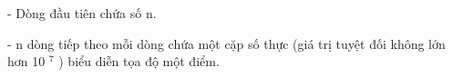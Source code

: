 - Dòng đầu tiên chứa số n.  

   - n dòng tiếp theo mỗi dòng chứa một cặp số thực (giá trị tuyệt đối không lớn hơn 10   $^    7   $   ) biểu diễn tọa độ một điểm.  

\